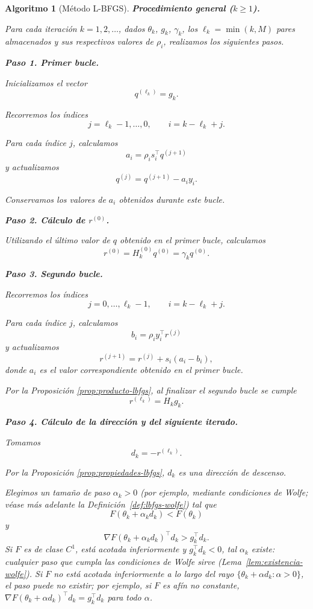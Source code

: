 \documentclass[a4paper,openany,oneside,10pt]{report}
\theoremstyle{pnlTeorema}
\theoremstyle{pnlDefinicion}
\newtheorem{algoritmo}{Algoritmo}[section]
\theoremstyle{pnlObservacion}
\begin{document}
\begin{algoritmo}[Método L-BFGS]
\noindent\textbf{Procedimiento general ($k\geq 1$).}

Para cada iteración $k=1,2,\ldots$, dados $\theta_k$,
$g_k$, $\gamma_k$, los $\ell_k=\min(k,M)$ pares
almacenados y sus respectivos valores de $\rho_i$,
realizamos los siguientes pasos.

\medskip

\noindent\textbf{Paso 1. Primer bucle.}

Inicializamos el vector
\[
    q^{(\ell_k)}=g_k.
\]

Recorremos los índices
\[
    j=\ell_k-1,\ldots,0,
    \qquad i=k-\ell_k+j.
\]

Para cada índice $j$, calculamos
\[
    a_i=\rho_i s_i^\top q^{(j+1)}
\]
y actualizamos
\[
    q^{(j)}=q^{(j+1)}-a_i y_i.
\]

Conservamos los valores de $a_i$ obtenidos durante
este bucle.

\medskip

\noindent\textbf{Paso 2. Cálculo de $r^{(0)}$.}

Utilizando el último valor de $q$ obtenido en el primer bucle,
calculamos
\[
    r^{(0)}=H_k^{(0)}q^{(0)}=\gamma_k q^{(0)}.
\]

\medskip

\noindent\textbf{Paso 3. Segundo bucle.}

Recorremos los índices
\[
    j=0,\ldots,\ell_k-1,
    \qquad i=k-\ell_k+j.
\]

Para cada índice $j$, calculamos
\[
    b_i=\rho_i y_i^\top r^{(j)}
\]
y actualizamos
\[
    r^{(j+1)}=r^{(j)}+s_i(a_i-b_i),
\]
donde $a_i$ es el valor correspondiente obtenido
en el primer bucle.

Por la Proposición \ref{prop:producto-lbfgs},
al finalizar el segundo bucle se cumple
\[
    r^{(\ell_k)}=H_k g_k.
\]

\medskip

\noindent\textbf{Paso 4. Cálculo de la dirección y del
siguiente iterado.}

Tomamos
\[
    d_k=-r^{(\ell_k)}.
\]

Por la Proposición \ref{prop:propiedades-lbfgs},
$d_k$ es una dirección de descenso.

Elegimos un tamaño de paso $\alpha_k>0$ (por ejemplo, mediante condiciones de Wolfe; véase más adelante la Definición~\ref{def:lbfgs-wolfe}) tal que
\[
    F(\theta_k+\alpha_k d_k)<F(\theta_k)
\]
y
\[
    \nabla F(\theta_k+\alpha_k d_k)^\top d_k
    >g_k^\top d_k.
\]
Si $F$ es de clase $C^1$, está acotada inferiormente y $g_k^\top d_k<0$, tal $\alpha_k$ existe: cualquier paso que cumpla las condiciones de Wolfe sirve (Lema~\ref{lem:existencia-wolfe}). Si $F$ no está acotada inferiormente a lo largo del rayo $\{\theta_k+\alpha d_k:\alpha>0\}$, el paso puede no existir; por ejemplo, si $F$ es afín no constante, $\nabla F(\theta_k+\alpha d_k)^\top d_k=g_k^\top d_k$ para todo $\alpha$.


\end{algoritmo}
\end{document}
